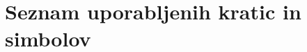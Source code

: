 \documentclass[12pt,a4paper,openany,twoside]{book}
\begin{document}
\newpage

\ \thispagestyle{empty}

\newpage

\renewcommand\thepage{} 
\tableofcontents 
\renewcommand\thepage{\arabic{page}}

\thispagestyle{empty}


\chapter*{Seznam uporabljenih kratic in simbolov}

\thispagestyle{empty}

\end{document}
